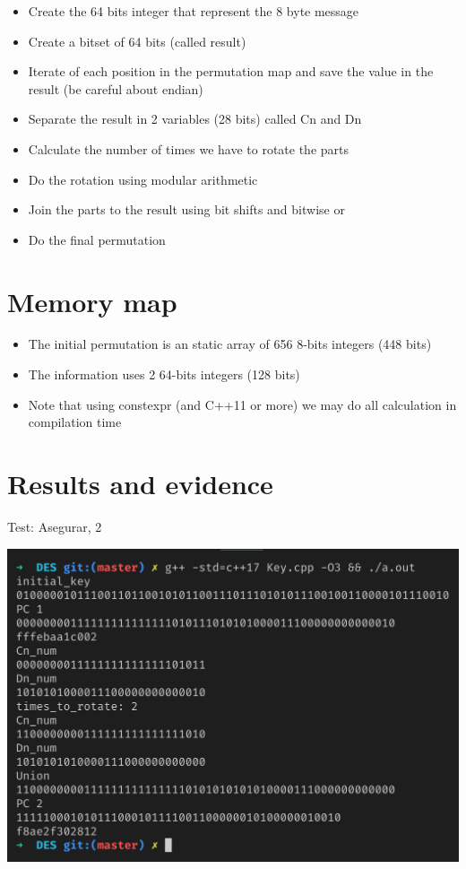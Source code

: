 \documentclass[fleqn, journal, onecolumn]{IEEEtran}             %
\theoremstyle{break}                                            %
\begin{document}
    \begin{itemize}
      \item Create the 64 bits integer that represent the 8 byte message
      \item Create a bitset of 64 bits (called result)
      \item Iterate of each position in the permutation map and save the value in the result (be careful about endian)
      \item Separate the result in 2 variables (28 bits) called Cn and Dn
      \item Calculate the number of times we have to rotate the parts
      \item Do the rotation using modular arithmetic
      \item Join the parts to the result using bit shifts and bitwise or
      \item Do the final permutation
    \end{itemize}

    \section{Memory map}

    \begin{itemize}
      \item The initial permutation is an static array of 656 8-bits integers (448 bits)
      \item The information uses 2 64-bits integers (128 bits)
      \item Note that using constexpr (and C++11 or more) we may do all calculation in compilation time 
    \end{itemize}

  \section{Results and evidence}

  Test: Asegurar, 2

  \begin{minipage}{.7\textwidth}
    \includegraphics[width=\linewidth]{2}
  \end{minipage}
  \\[2cm]
\end{document}
